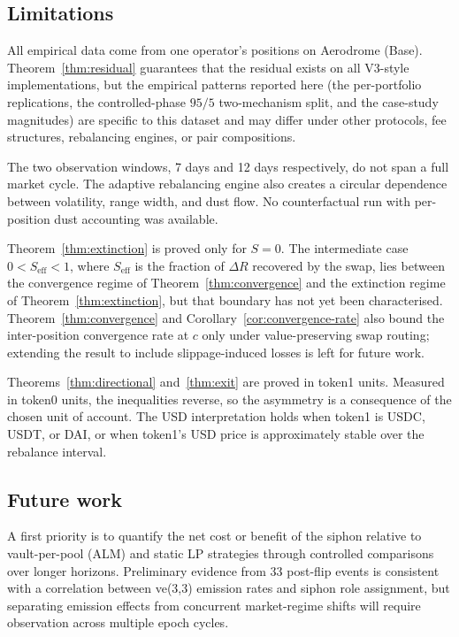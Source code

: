 \documentclass[11pt,a4paper]{article}
\theoremstyle{plain}
\begin{document}
\subsection{Limitations}\label{sec:limitations}

All empirical data come from one operator's positions on Aerodrome (Base). Theorem~\ref{thm:residual} guarantees that the residual exists on all V3-style implementations, but the empirical patterns reported here (the per-portfolio replications, the controlled-phase $95/5$ two-mechanism split, and the case-study magnitudes) are specific to this dataset and may differ under other protocols, fee structures, rebalancing engines, or pair compositions.

The two observation windows, 7 days and 12 days respectively, do not span a full market cycle. The adaptive rebalancing engine also creates a circular dependence between volatility, range width, and dust flow. No counterfactual run with per-position dust accounting was available.

Theorem~\ref{thm:extinction} is proved only for $S = 0$. The intermediate case $0 < S_{\text{eff}} < 1$, where $S_{\text{eff}}$ is the fraction of $\Delta R$ recovered by the swap, lies between the convergence regime of Theorem~\ref{thm:convergence} and the extinction regime of Theorem~\ref{thm:extinction}, but that boundary has not yet been characterised. Theorem~\ref{thm:convergence} and Corollary~\ref{cor:convergence-rate} also bound the inter-position convergence rate at $c$ only under value-preserving swap routing; extending the result to include slippage-induced losses is left for future work.

Theorems~\ref{thm:directional} and~\ref{thm:exit} are proved in token1 units. Measured in token0 units, the inequalities reverse, so the asymmetry is a consequence of the chosen unit of account. The USD interpretation holds when token1 is USDC, USDT, or DAI, or when token1's USD price is approximately stable over the rebalance interval.

\subsection{Future work}\label{sec:future}

A first priority is to quantify the net cost or benefit of the siphon relative to vault-per-pool (ALM) and static LP strategies through controlled comparisons over longer horizons. Preliminary evidence from 33 post-flip events is consistent with a correlation between ve(3,3) emission rates and siphon role assignment, but separating emission effects from concurrent market-regime shifts will require observation across multiple epoch cycles.
\end{document}

